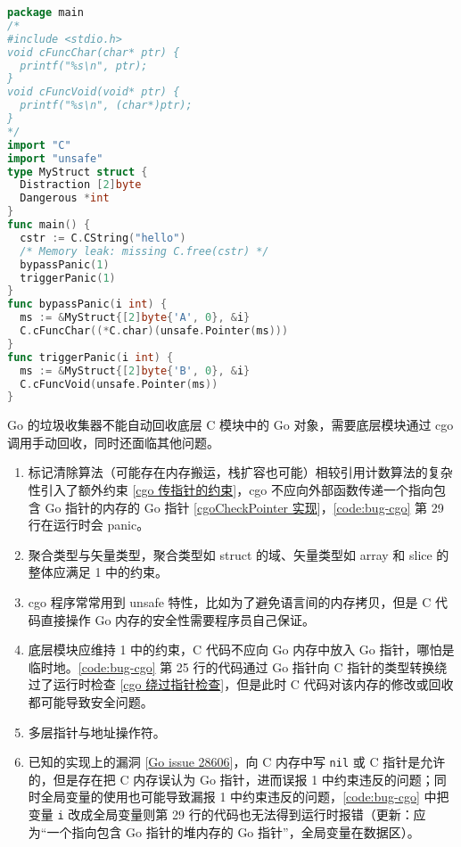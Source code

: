 \begin{lstfloat}
\begin{lstlisting}[language={Go},caption={错误的 cgo 程序},label={code:bug-cgo}]
package main
/*
#include <stdio.h>
void cFuncChar(char* ptr) {
  printf("%s\n", ptr);
}
void cFuncVoid(void* ptr) {
  printf("%s\n", (char*)ptr);
}
*/
import "C"
import "unsafe"
type MyStruct struct {
  Distraction [2]byte
  Dangerous *int
}
func main() {
  cstr := C.CString("hello")
  /* Memory leak: missing C.free(cstr) */
  bypassPanic(1)
  triggerPanic(1)
}
func bypassPanic(i int) {
  ms := &MyStruct{[2]byte{'A', 0}, &i}
  C.cFuncChar((*C.char)(unsafe.Pointer(ms)))
}
func triggerPanic(i int) {
  ms := &MyStruct{[2]byte{'B', 0}, &i}
  C.cFuncVoid(unsafe.Pointer(ms))
}
\end{lstlisting}
\end{lstfloat}

Go 的垃圾收集器不能自动回收底层 C 模块中的 Go 对象，需要底层模块通过 cgo 调用手动回收，同时还面临其他问题。

\begin{enumerate}
\item 标记清除算法（可能存在内存搬运，栈扩容也可能）相较引用计数算法的复杂性引入了额外约束 [\href{https://pkg.go.dev/cmd/cgo#hdr-Passing_pointers}{cgo 传指针的约束}]，cgo 不应向外部函数传递一个指向包含 Go 指针的内存的 Go 指针 [\href{https://go.dev/src/runtime/cgocall.go#L362}{cgoCheckPointer 实现}]，\autoref{code:bug-cgo} 第 29 行在运行时会 panic。
\item 聚合类型与矢量类型，聚合类型如 struct 的域、矢量类型如 array 和 slice 的整体应满足 1 中的约束。
\item cgo 程序常常用到 unsafe 特性，比如为了避免语言间的内存拷贝，但是 C 代码直接操作 Go 内存的安全性需要程序员自己保证。
\item 底层模块应维持 1 中的约束，C 代码不应向 Go 内存中放入 Go 指针，哪怕是临时地。\autoref{code:bug-cgo} 第 25 行的代码通过 Go 指针向 C 指针的类型转换绕过了运行时检查 [\href{http://www.loglop.com/pages/20210326-01.html}{cgo 绕过指针检查}]，但是此时 C 代码对该内存的修改或回收都可能导致安全问题。
\item 多层指针与地址操作符。
\item 已知的实现上的漏洞 [\href{https://github.com/golang/go/issues/28606}{Go issue 28606}]，向 C 内存中写 \texttt{nil} 或 C 指针是允许的，但是存在把 C 内存误认为 Go 指针，进而误报 1 中约束违反的问题；同时全局变量的使用也可能导致漏报 1 中约束违反的问题，\autoref{code:bug-cgo} 中把变量 \texttt{i} 改成全局变量则第 29 行的代码也无法得到运行时报错（更新：应为“一个指向包含 Go 指针的堆内存的 Go 指针”，全局变量在数据区）。
\end{enumerate}

